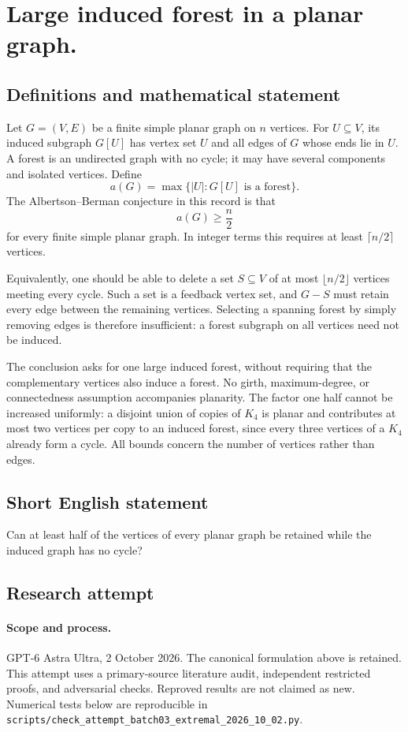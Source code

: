 \documentclass[11pt,a4paper]{article}
\begin{document}
\section*{Large induced forest in a planar graph.}\label{statement}

\subsection{Definitions and mathematical statement}
Let $G=(V,E)$ be a finite simple planar graph on $n$ vertices. For
$U\subseteq V$, its induced subgraph $G[U]$ has vertex set $U$ and
all edges of $G$ whose ends lie in $U$. A forest is an undirected
graph with no cycle; it may have several components and isolated
vertices. Define
\[
                      a(G)=\max\{|U|:G[U]\text{ is a forest}\}.
\]
The Albertson--Berman conjecture in this record is that
\[
                                a(G)\ge\frac n2
\]
for every finite simple planar graph. In integer terms this requires
at least $\lceil n/2\rceil$ vertices.

Equivalently, one should be able to delete a set $S\subseteq V$ of
at most $\lfloor n/2\rfloor$ vertices meeting every cycle. Such a set
is a feedback vertex set, and $G-S$ must retain every edge between
the remaining vertices. Selecting a spanning forest by simply
removing edges is therefore insufficient: a forest subgraph on all
vertices need not be induced.

The conclusion asks for one large induced forest, without requiring
that the complementary vertices also induce a forest. No girth,
maximum-degree, or connectedness assumption accompanies planarity.
The factor one half cannot be increased uniformly: a disjoint union
of copies of $K_4$ is planar and contributes at most two vertices
per copy to an induced forest, since every three vertices of a
$K_4$ already form a cycle. All bounds concern the number of
vertices rather than edges.
\subsection{Short English statement}
Can at least half of the vertices of every planar graph be retained while the induced graph has no cycle?
\subsection{Research attempt}
\paragraph{Scope and process.}
GPT-6 Astra Ultra, 2 October 2026. The canonical formulation above is retained. This attempt uses a primary-source literature audit, independent restricted proofs, and adversarial checks. Reproved results are not claimed as new. Numerical tests below are reproducible in \texttt{scripts/check\_attempt\_batch03\_extremal\_2026\_10\_02.py}.
\end{document}
